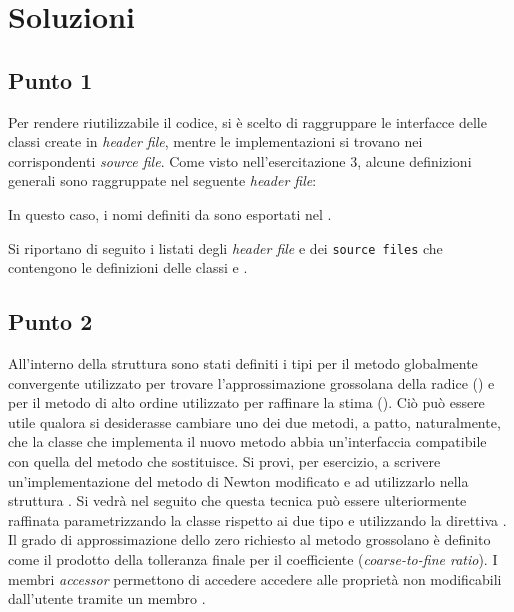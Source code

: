 \newpage

\section*{Soluzioni}

\subsection*{Punto 1}
Per rendere riutilizzabile il codice, si \`e scelto di raggruppare le
interfacce delle classi create in \emph{header file}, mentre le
implementazioni si trovano nei corrispondenti \emph{source
file}. Come visto nell'esercitazione 3, alcune definizioni generali sono
raggruppate nel seguente \emph{header 
file}: 
%
\lstset{basicstyle=\scriptsize\sf}

\lstset{basicstyle=\sf}

In questo caso, i nomi definiti da  sono
esportati nel  .

Si riportano di seguito i listati degli \emph{header file} e dei
\texttt{source files} che
contengono le definizioni delle classi  e .
\lstset{basicstyle=\scriptsize\sf}




\lstset{basicstyle=\sf}


\subsection*{Punto 2}
\lstset{basicstyle=\scriptsize\sf}


\lstset{basicstyle=\sf}

All'interno della struttura  sono stati definiti i tipi
per il metodo globalmente convergente utilizzato per trovare
l'approssimazione grossolana della radice () e per il
metodo di alto ordine utilizzato per raffinare la stima
(). Ci\`o pu\`o essere utile qualora si desiderasse
cambiare uno dei due metodi, a patto, naturalmente, che la classe che
implementa il nuovo metodo abbia un'interfaccia compatibile con quella
del metodo che sostituisce. Si provi, per esercizio, a scrivere
un'implementazione del metodo di Newton modificato e ad utilizzarlo
nella struttura . Si vedr\`a nel seguito che questa
tecnica pu\`o essere ulteriormente raffinata parametrizzando la classe
 rispetto ai due tipo  e 
utilizzando la direttiva .
Il grado di approssimazione dello zero richiesto al metodo grossolano
\`e definito come il prodotto della tolleranza finale  per il
coefficiente  (\emph{coarse-to-fine ratio}).
I membri \emph{accessor} permettono di accedere accedere alle
 propriet\`a non modificabili dall'utente tramite un membro .

